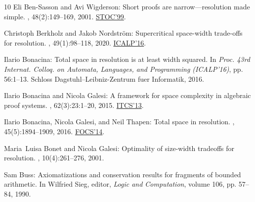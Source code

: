 \begin{thebibliography}{10}
{\sc Eli {Ben-Sasson} and Avi Wigderson}: Short proofs are narrow---resolution
  made simple.
, 48(2):149--169, 2001.
\newblock \prelim \href{https://doi.org/10.1145/301250.301392}{STOC'99}.
\newblock [\epfmtdoi{10.1145/375827.375835}]

{\sc Christoph Berkholz and Jakob Nordstr{\"{o}}m}: Supercritical space-width
  trade-offs for resolution.
, 49(1):98--118, 2020.
\newblock \prelim
  \href{https://doi.org/10.4230/LIPIcs.ICALP.2016.57}{ICALP'16}.
\newblock [\epfmtdoi{10.1137/16M1109072}]

{\sc Ilario Bonacina}: Total space in resolution is at least width squared.
\newblock In {\em Proc. 43rd Internat. Colloq. on Automata, Languages, and
  Programming (ICALP'16)}, pp. 56:1--13. Schloss Dagstuhl--Leibniz-Zentrum fuer
  Informatik, 2016.

{\sc Ilario Bonacina and Nicola Galesi}: A framework for space complexity in
  algebraic proof systems.
, 62(3):23:1--20, 2015.
\newblock \prelim \href{https://doi.org/10.1145/2422436.2422486}{ITCS'13}.
\newblock [\epfmtdoi{10.1145/2699438}]

{\sc Ilario Bonacina, Nicola Galesi, and Neil Thapen}: Total space in
  resolution.
, 45(5):1894--1909, 2016.
\newblock \prelim \href{https://doi.org/10.1109/FOCS.2014.74}{FOCS'14}.
\newblock [\epfmtdoi{10.1137/15M1023269}]

{\sc Maria~Luisa Bonet and Nicola Galesi}: Optimality of size-width tradeoffs
  for resolution.
, 10(4):261--276, 2001.
\newblock [\epfmtdoi{10.1007/s000370100000}]

{\sc Sam Buss}: Axiomatizations and conservation results for fragments of
  bounded arithmetic.
\newblock In {\sc Wilfried Sieg}, editor, {\em Logic and Computation}, volume
  106, pp. 57--84, 1990.


\end{thebibliography}
